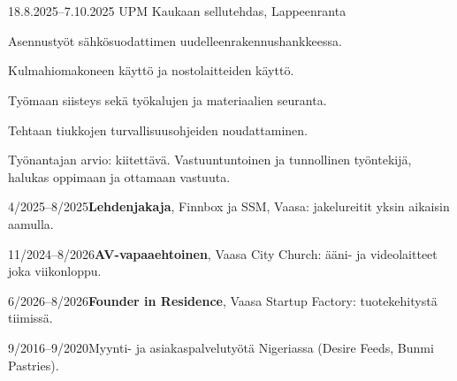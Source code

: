 \documentclass[a4paper,11pt]{article}
\begin{document}
\section{}
\begin{cventry}{18.8.2025--7.10.2025}{}
  UPM Kaukaan sellutehdas, Lappeenranta\par
  Asennustyöt sähkösuodattimen uudelleenrakennushankkeessa.\par
  Kulmahiomakoneen käyttö ja nostolaitteiden käyttö.\par
  Työmaan siisteys sekä työkalujen ja materiaalien seuranta.\par
  Tehtaan tiukkojen turvallisuusohjeiden noudattaminen.\par
  Työnantajan arvio: kiitettävä. Vastuuntuntoinen ja tunnollinen työntekijä, halukas oppimaan ja ottamaan vastuuta.
\end{cventry}
\begin{cventry}{4/2025--8/2025}{\textbf{Lehdenjakaja}, Finnbox ja SSM, Vaasa: jakelureitit yksin aikaisin aamulla.}
\end{cventry}
\begin{cventry}{11/2024--8/2026}{\textbf{AV-vapaaehtoinen}, Vaasa City Church: ääni- ja videolaitteet joka viikonloppu.}
\end{cventry}
\begin{cventry}{6/2026--8/2026}{\textbf{Founder in Residence}, Vaasa Startup Factory: tuotekehitystä tiimissä.}
\end{cventry}
\begin{cventry}{9/2016--9/2020}{Myynti- ja asiakaspalvelutyötä Nigeriassa (Desire Feeds, Bunmi Pastries).}
\end{cventry}

\section{}

\section{}
\end{document}
